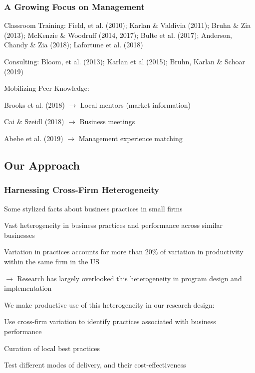 \documentclass[hideothersubsections, usenames,dvipsnames,11pt]{beamer}
\newenvironment{itemize_2pt}{\itemize\addtolength{\itemsep}{2pt}}{\enditemize}
\begin{document}
\begin{frame}
\frametitle{A Growing Focus on Management}
\begin{itemize_2pt}
\item \textcolor{bdf}{Classroom Training}: Field, et al. (2010); Karlan \& Valdivia (2011); Bruhn \& Zia (2013); McKenzie \& Woodruff (2014, 2017); Bulte et al. (2017); Anderson, Chandy \& Zia (2018); Lafortune et al. (2018)
\vspace{0.1in}
\item \textcolor{bdf}{Consulting}: Bloom, et al. (2013); Karlan et al (2015); Bruhn, Karlan \& Schoar (2019)
\vspace{0.1in}

\item \textcolor{bdf}{Mobilizing Peer Knowledge}:
    \begin{itemize_2pt}
    \item Brooks et al. (2018) $\rightarrow$ Local mentors (market information)
    \item Cai \& Szeidl (2018) $\rightarrow$ Business meetings
    \item Abebe et al. (2019) $\rightarrow$ Management experience matching
    \end{itemize_2pt}
    \vspace{0.1in}
\end{itemize_2pt}
\end{frame}

\subsection{Our Approach}
\begin{frame}
\frametitle{Harnessing Cross-Firm Heterogeneity}
Some stylized facts about business practices in small firms
\begin{itemize_2pt}
	\item Vast heterogeneity in business practices and performance across similar businesses \citep{deMel2009}
	\item Variation in practices accounts for more than 20\% of variation in productivity within the same firm in the US \citep{Bloom2019}
	\item[] $\rightarrow$ Research has largely overlooked this heterogeneity in program design and implementation
\end{itemize_2pt}

\vspace{0.5em}
\pause

We \textcolor{bdf}{make productive use of this heterogeneity} in our research design: 
\begin{itemize_2pt}
	\item Use cross-firm variation to identify \textcolor{bdf}{practices associated with business performance}
	\item \textcolor{bdf}{Curation} of local best practices
	\item Test different \textcolor{bdf}{modes of delivery}, and their cost-effectiveness
\end{itemize_2pt}

\end{frame}
\end{document}
